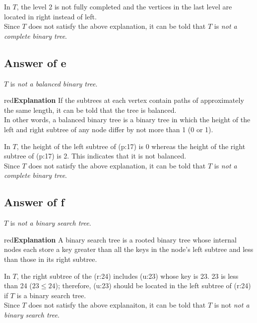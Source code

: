 \documentclass[12pt]{article}
\newenvironment{explanation}[1][\unskip]{\begin{mybox}{red}{\textbf{Explanation} \textit{#1}}}{\end{mybox}}
\begin{document}
\noindent In $T$, the level 2 is not fully completed and the vertices in the last level are located in right instead of left.\\

\noindent Since $T$ does not satisfy the above explanation, it can be told that $T$ is \textit{not a complete binary tree}.

\subsection*{Answer of e}

$T$ is \textit{not a balanced binary tree}.

\begin{explanation}
If the subtrees at each vertex contain paths of approximately the same length, it can be told that the tree is balanced.\\

In other words, a balanced binary tree is a binary tree in which the height of the left and right subtree of any node differ by not more than 1 (0 or 1).
\end{explanation}

\noindent In $T$, the height of the left subtree of (p:17) is 0 whereas the height of the right subtree of (p:17) is 2. This indicates that it is not balanced.\\

\noindent Since $T$ does not satisfy the above explanation, it can be told that $T$ is \textit{not a complete binary tree}.

\subsection*{Answer of f}

$T$ is \textit{not a binary search tree}.

\begin{explanation}
A binary search tree is a rooted binary tree whose internal nodes each store a key greater than all the keys in the node’s left subtree and less than those in its right subtree.
\end{explanation}

\noindent In $T$, the right subtree of the (r:24) includes (u:23) whose key is 23. 23 is less than 24 ($23 \leq 24$); therefore, (u:23) should be located in the left subtree of (r:24) if $T$ is a binary search tree.\\

\noindent Since $T$ does not satisfy the above explanaiton, it can be told that $T$ is not \textit{not a binary search tree}.
\end{document}
